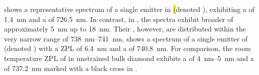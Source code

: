 	 shows a representative spectrum of a single emitter in \hl (denoted \emnarrow), exhibiting a \ZPL \lw of \SI{1.4}{nm} and a \cwl of \SI{726.5}{nm}.
	In contrast, in \vl, the spectra exhibit broader \ZPL \lws of approximately \SI{5}{nm} up to \SI{18}{nm}.
	Their \ZPL \cwls, however, are distributed within the very narrow range of \SIrange{738}{741}{nm}.
	 shows a spectrum of a single emitter of \vl (denoted \embroad) with a ZPL \lw of \SI{6.4}{nm} and a \cwl of \SI{740.8}{nm}.
	For comparison, the room temperature ZPL of \sivs in unstrained bulk diamond exhibits a \lw of \SIrange{4}{5}{nm} and a \cwl of \SI{737.2}{nm} marked with a black cross in  \cite{Arend2016a,Dietrich2014}.

	\begin{figure}[!htb]
		\begin{subfigure}{0.5\linewidth}
			\centering
			\caption{}\label{subfig::emnarrow}
		\end{subfigure}
		\hfill
		\begin{subfigure}{0.5\linewidth}
			\centering

\end{subfigure}
\end{figure}
